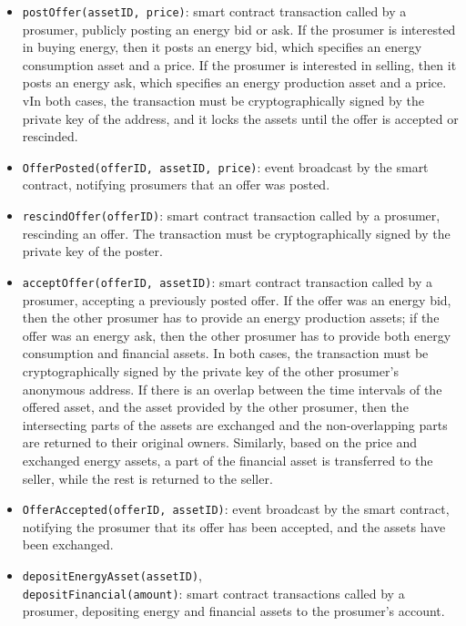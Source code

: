 \begin{itemize}[leftmargin=*]
\item \texttt{postOffer(assetID, price)}: smart contract transaction called by a prosumer, publicly posting an energy bid or ask.
If the prosumer is interested in buying energy, then it posts an energy bid, which specifies an energy consumption asset and a price.
If the prosumer is interested in selling, then it posts an energy ask, which specifies an energy production asset and a price.
vIn both cases, the transaction must be cryptographically signed by the private key of the address, and it locks the assets until the offer is accepted or rescinded.
\item \texttt{OfferPosted(offerID, assetID, price)}:
event broadcast by the smart contract, notifying prosumers that an offer was posted.
\item \texttt{rescindOffer(offerID)}:
smart contract transaction called by a prosumer, rescinding an offer.
The transaction must be cryptographically signed by the private key of the poster.
\item \texttt{acceptOffer(offerID, assetID)}:
smart contract transaction called by a prosumer,
accepting a previously posted offer. %
If the offer was an energy bid, then the other prosumer has to provide an energy production assets;
if the offer was an energy ask, then the other prosumer has to provide both energy consumption and financial assets.
In both cases, the transaction must be cryptographically signed by the private key of the other prosumer's anonymous address.
If there is an overlap between the time intervals of the offered asset, and the asset provided by the other prosumer, then the intersecting parts of the assets are exchanged and the non-overlapping parts are returned to their original owners.
Similarly, based on the price and exchanged energy assets, a part of the financial asset is transferred to the seller, while the rest is returned to the seller. 
\item \texttt{OfferAccepted(offerID, assetID)}:
event broadcast by the smart contract,
notifying the prosumer that its offer has been accepted, and the assets have been exchanged.
\item \texttt{depositEnergyAsset(assetID)},\\\texttt{depositFinancial(amount)}:
smart contract transactions called by a prosumer,
depositing energy and financial assets to the prosumer's account.

\end{itemize}
